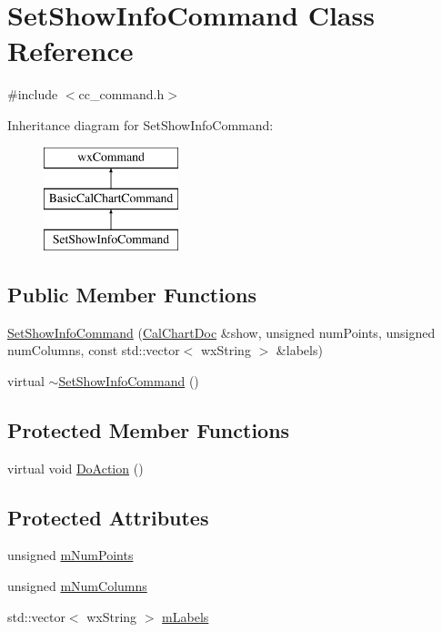 \hypertarget{a00136}{\section{Set\-Show\-Info\-Command Class Reference}
\label{a00136}
}


{\ttfamily \#include $<$cc\-\_\-command.\-h$>$}

Inheritance diagram for Set\-Show\-Info\-Command\-:\begin{figure}[H]
\begin{center}
\leavevmode
\includegraphics[height=3.000000cm]{a00136}
\end{center}
\end{figure}
\subsection*{Public Member Functions}
\begin{DoxyCompactItemize}
\item 
\hyperlink{a00136_ada018fa9dfb52ae417b284c2495da4ab}{Set\-Show\-Info\-Command} (\hyperlink{a00020}{Cal\-Chart\-Doc} \&show, unsigned num\-Points, unsigned num\-Columns, const std\-::vector$<$ wx\-String $>$ \&labels)
\item 
virtual \hyperlink{a00136_ac47e5b567b81b2959996d03058b79997}{$\sim$\-Set\-Show\-Info\-Command} ()
\end{DoxyCompactItemize}
\subsection*{Protected Member Functions}
\begin{DoxyCompactItemize}
\item 
virtual void \hyperlink{a00136_abf979162c4c398c5f11057410f3c2bc2}{Do\-Action} ()
\end{DoxyCompactItemize}
\subsection*{Protected Attributes}
\begin{DoxyCompactItemize}
\item 
unsigned \hyperlink{a00136_aef24aa82f671e920fe63eb00c20bab9a}{m\-Num\-Points}
\item 
unsigned \hyperlink{a00136_a4d62eceaf69d3ec198fde071f5880463}{m\-Num\-Columns}
\item 
std\-::vector$<$ wx\-String $>$ \hyperlink{a00136_ab4c39c419e60dd039927200bb3d671f3}{m\-Labels}
\end{DoxyCompactItemize}


